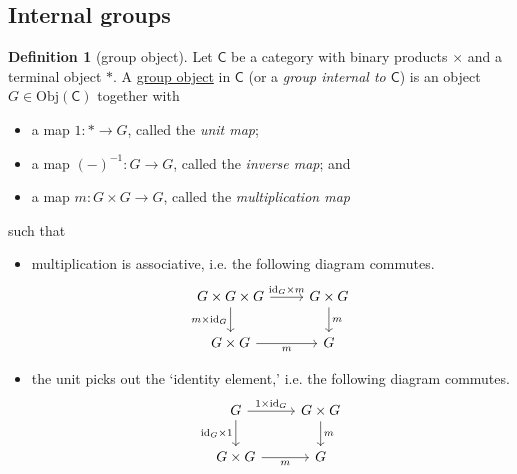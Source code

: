 \documentclass[a4paper,10pt]{scrreprt}
\newcommand{\defn}[1]{\ul{#1}}
\newcommand{\Obj}{\mathrm{Obj}}
\theoremstyle{definition}
\newtheorem{definition}{Definition}[section]
\theoremstyle{plain}
\theoremstyle{remark}
\begin{document}
\subsection{Internal groups}
\begin{definition}[group object]
  \label{def:groupobject}
  Let $\mathsf{C}$ be a category with binary products $\times$ and a terminal object $*$. A \defn{group object} in $\mathsf{C}$ (or a \emph{group internal to $\mathsf{C}$}) is an object $G \in \Obj(\mathsf{C})$ together with 
  \begin{itemize}
    \item a map $1\colon * \to G$, called the \emph{unit map};

    \item a map $(-)^{-1}\colon G \to G$, called the \emph{inverse map}; and

    \item a map $m\colon G \times G \to G$, called the \emph{multiplication map}
  \end{itemize}
  such that 
  \begin{itemize}
    \item multiplication is associative, i.e. the following diagram commutes.
      \begin{equation*}
        \begin{tikzcd}
          G \times G \times G
          \arrow[r, "\mathrm{id}_{G} \times m"]
          \arrow[d, swap, "m \times \mathrm{id}_{G}"]
          & G \times G
          \arrow[d, "m"]
          \\
          G \times G
          \arrow[r, swap, "m"]
          & G
        \end{tikzcd}
      \end{equation*}

    \item the unit picks out the `identity element,' i.e. the following diagram commutes.
      \begin{equation*}
        \begin{tikzcd}
          G
          \arrow[r, "1 \times \mathrm{id}_{G}"]
          \arrow[d, swap, "\mathrm{id}_{G} \times 1"]
          & G \times G
          \arrow[d, "m"]
          \\
          G \times G
          \arrow[r, swap, "m"]
          & G
        \end{tikzcd}
      \end{equation*}


\end{itemize}
\end{definition}
\end{document}
